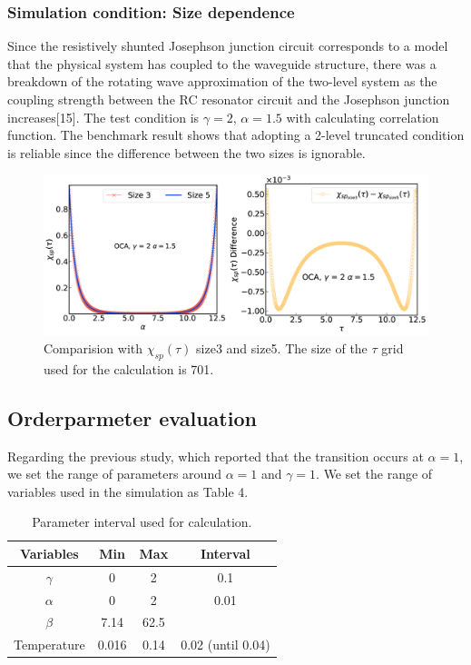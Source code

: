 \documentclass{article}[12pt]
\begin{document}
\begin{spacing}{1.3}
\subsubsection*{Simulation condition: Size dependence}
Since the resistively shunted Josephson junction circuit corresponds to a model that the physical system has coupled to the waveguide structure,
there was a breakdown of the rotating wave approximation of the two-level system as the coupling strength between the RC resonator circuit 
and the Josephson junction increases[15]. The test condition is $\gamma =2$, $\alpha = 1.5$ with calculating correlation function. 
The benchmark result shows that adopting a 2-level truncated condition is reliable since the difference between the two sizes is ignorable.
\begin{figure}[H]
  \centerline{\includegraphics[width=13cm]{TexFigure/4/4_2_02_sizediff.png}}
  \caption{Comparision with $\chi_{sp}(\tau)$ size3 and size5. The size of the $\tau$ grid used for the calculation is 701.}
\end{figure}
\subsection{Orderparmeter evaluation}
Regarding the previous study, which reported that the transition occurs at $\alpha = 1$, we set the range of parameters around $\alpha = 1$ and $\gamma = 1$.
We set the range of variables used in the simulation as Table 4.
\begin{table}[htbp]
  \centering
  \renewcommand{\arraystretch}{1.2}  %
  \begin{tabular}{@{}cccc@{}}
  \toprule
  \textbf{Variables} & \textbf{Min} & \textbf{Max}  & \textbf{Interval}\\ 
  \midrule
  $\gamma$ & 0 & 2 & 0.1 \\
  $\alpha$ & 0 & 2 & 0.01 \\
  $\beta$ & 7.14 & 62.5 &  \\
  Temperature & 0.016 & 0.14 & 0.02 (until 0.04) \\
  \bottomrule
  \end{tabular}
  \caption{Parameter interval used for calculation.}
  \end{table}

\end{spacing}
\end{document}
